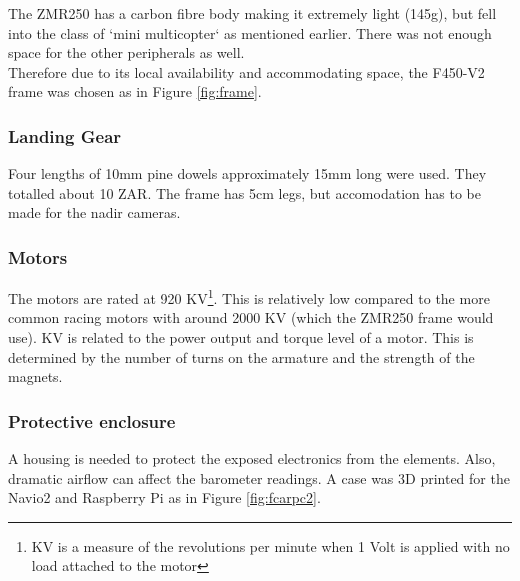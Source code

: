 The ZMR250 has a carbon fibre body making it extremely light (145g), but fell into the class of `mini multicopter` as mentioned earlier. There was not enough space for the other peripherals as well.\\

Therefore due to its local availability and accommodating space, the F450-V2 frame was chosen as in Figure \ref{fig:frame}.

\subsubsection{Landing Gear}

Four lengths of 10mm pine dowels approximately 15mm long were used. They totalled about 10 ZAR. The frame has 5cm legs, but accomodation has to be made for the nadir cameras.

\subsubsection{Motors}

The motors are rated at 920 KV\footnote{KV is a measure of the revolutions per minute when 1 Volt is applied with no load attached to the motor}. This is relatively low compared to the more common racing motors with around 2000 KV (which the ZMR250 frame would use). KV is related to the power output and torque level of a motor. This is determined by the number of turns on the armature and the strength of the magnets.

\subsubsection{Protective enclosure}

A housing is needed to protect the exposed electronics from the elements. Also, dramatic airflow can affect the barometer readings. A case\cite{3d_case} was 3D printed for the Navio2 and Raspberry Pi as in Figure \ref{fig:fcarpc2}.

